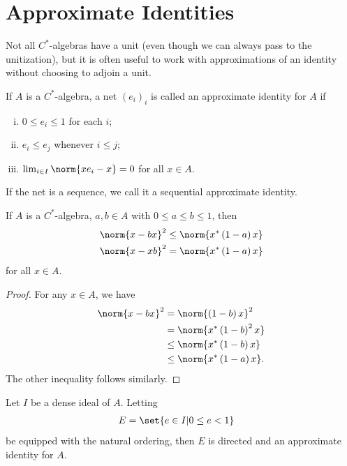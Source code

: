 \documentclass[10pt]{mypackage}
\begin{document}
\section{Approximate Identities}%
Not all $C^{\ast}$-algebras have a unit (even though we can always pass to the unitization), but it is often useful to work with approximations of an identity without choosing to adjoin a unit.
\begin{definition}
  If $A$ is a $C^{\ast}$-algebra, a net $\left( e_{i} \right)_{i}$ is called an approximate identity for $A$ if
  \begin{enumerate}[(i)]
    \item $0\leq e_i \leq 1$ for each $i$;
    \item $e_i\leq e_j$ whenever $i\leq j$;
    \item $\lim_{i\in I}\norm{xe_i-x} = 0$ for all $x\in A$.
  \end{enumerate}
  If the net is a sequence, we call it a sequential approximate identity.
\end{definition}
\begin{lemma}
  If $A$ is a $C^{\ast}$-algebra, $a,b\in A$ with $0\leq a \leq b \leq 1$, then
  \begin{align*}
    \norm{x-bx}^2 &\leq \norm{x^{\ast}\left( 1-a \right)x}\\
    \norm{x-xb}^2 &= \norm{x^{\ast}\left( 1-a \right)x}
  \end{align*}
  for all $x\in A$.
\end{lemma}
\begin{proof}
  For any $x\in A$, we have
  \begin{align*}
    \norm{x-bx}^2 &= \norm{\left( 1-b \right)x}^2\\
                  &= \norm{x^{\ast}\left( 1-b \right)^2 x}\\
                  &\leq \norm{x^{\ast}\left( 1-b \right)x}\\
                  &\leq \norm{x^{\ast}\left( 1-a \right)x}.
  \end{align*}
  The other inequality follows similarly.
\end{proof}
\begin{theorem}
  Let $I$ be a dense ideal of $A$. Letting
  \begin{align*}
    E &= \set{e\in I | 0\leq e < 1}
  \end{align*}
  be equipped with the natural ordering, then $E$ is directed and an approximate identity for $A$.
\end{theorem}
\end{document}
